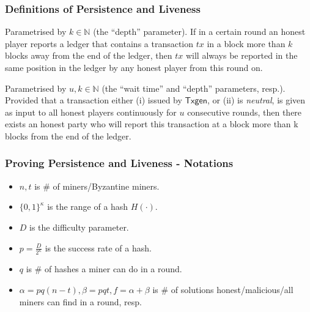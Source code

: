\documentclass{beamer}
\begin{document}
\begin{frame}
\frametitle{Definitions of Persistence and Liveness}

\begin{definition}[Persistence]
    Parametrised by $k \in \mathbb{N}$ (the ``depth'' parameter). If in a certain round an honest player reports a ledger that contains a transaction $tx$ in a block more than $k$ blocks away from the end of the ledger, then $tx$ will always be reported in the same position in the ledger by any honest player from this round on.
\end{definition}

\begin{definition}[Liveness]
    Parametrised by $u, k \in \mathbb{N}$ (the ``wait time'' and ``depth'' parameters, resp.). Provided that a transaction either (i) issued by $\mathsf{Txgen}$, or (ii) is \emph{neutral}, is given as input to all honest players continuously for $u$ consecutive rounds, then there exists an honest party who will report this transaction at a block more than k blocks from the end of the ledger.
\end{definition}

\end{frame}


\begin{frame}
\frametitle{Proving Persistence and Liveness - Notations}

\begin{itemize}
    \item $n, t$ is \# of miners/Byzantine miners.
    \item $\{0, 1\}^\kappa$ is the range of a hash $H(\cdot)$.
    \item $D$ is the difficulty parameter.
    \item $p = \frac{D}{2^\kappa}$ is the success rate of a hash.
    \item $q$ is \# of hashes a miner can do in a round.
    \item $\alpha = pq(n-t), \beta = pqt, f = \alpha + \beta$ is \# of solutions honest/malicious/all miners can find in a round, resp.
\end{itemize}

\end{frame}
\end{document}
